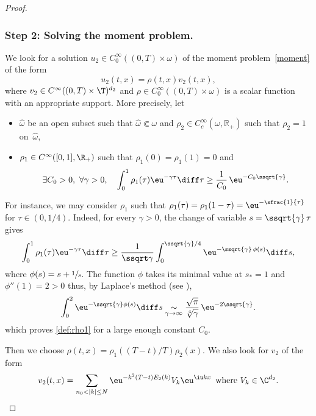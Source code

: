 \begin{proof}
\subsubsection*{Step 2: Solving the moment problem.} We look for a solution $u_2 \in C^\infty_0((0,T)\times \omega)$ of the moment problem~\eqref{moment} of the form
\begin{equation} \label{form_u2}
u_2(t,x)=\rho(t,x) v_2(t,x),
\end{equation}
where $v_2 \in C^\infty((0,T)\times\T)^{d_2}$ and $\rho \in C^\infty_0((0,T)\times\omega)$ is a scalar function with an appropriate support. More precisely, let
\begin{itemize}
\item $\widehat{\omega}$ be an open subset such that $\widehat{\omega} \Subset \omega$ and $\rho_2 \in C^\infty_c(\omega,\mathbb{R}_+)$ such that $\rho_2=1$ on~$\widehat{\omega}$,
\item $\rho_1 \in C^\infty([0,1],\R_+)$ such that $\rho_1(0)=\rho_1(1)=0$ and
\begin{equation} \label{def:rho1}
\exists C_0 >0,\ \forall \gamma>0, \quad \int_0^1 \rho_1(\tau) \eu^{-\gamma \tau} \diff \tau \geq \frac{1}{C_0}\, \eu^{-C_0\ssqrt{\gamma}}.
\end{equation}
\end{itemize}

For instance, we may consider $\rho_1$ such that $\rho_1(\tau)=\rho_1(1-\tau)=\eu^{-\sfrac{1}{\tau}}$ for $\tau\in(0,1/4)$. Indeed, for every $\gamma>0$,
the change of variable $s=\ssqrt{\gamma}\, \tau$ gives
\[
\int_0^1 \rho_1(\tau) \eu^{-\gamma \tau} \diff \tau \geq \frac1{\ssqrt\gamma}\int_{0}^{\ssqrt{\gamma}/4} \eu^{-\ssqrt{\gamma}\,\phi(s)} \diff s,
\]
where $\phi(s)=s+\sfrac{1}{s}$. The function $\phi$ takes its minimal value at $s_*=1$ and $\phi''(1)=2>0$ thus, by Laplace's method (see \cite[Ch.\,9, Th.\,VI.1]{queffelec_2013}),
\[
\int_{0}^{2} \eu^{-\ssqrt{\gamma}\phi(s)} \diff s \underset{\gamma \to \infty}{\sim} \frac{\sqrt{\pi}}{\sqrt[4]{\smash[b]\gamma}}\, \eu^{-2\ssqrt{\gamma}}.
\]
which proves \eqref{def:rho1} for a large enough constant $C_0$.

Then we choose $\rho(t,x) = \rho_1((T-t)/T)\rho_2(x)$. We also look for $v_2$ of the form
\begin{equation} \label{form_v2}
v_2(t,x)=\sum_{n_0<|k|\leq N} \eu^{-k^2(T-t)E_2(k)} V_k \eu^{\iu kx}\, \text{ where } V_k \in \C^{d_2}.
\end{equation}


\end{proof}
